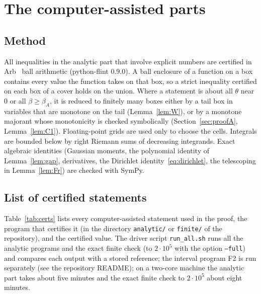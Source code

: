 \documentclass[11pt]{amsart}
\theoremstyle{definition}
\theoremstyle{remark}
\numberwithin{equation}{section}
\begin{document}
\section{The computer-assisted parts}\label{sec:computer}

\subsection{Method}
All inequalities in the analytic part that involve explicit numbers are certified in Arb~\cite{Arb} ball arithmetic (python-flint 0.9.0).
A ball enclosure of a function on a box contains every value the function takes on that box, so a strict inequality certified on each box of
a cover holds on the union. Where a statement is about all $\theta$ near $0$ or all $\beta\ge\beta_A$, it is reduced to finitely many boxes
either by a tail box in variables that are monotone on the tail (Lemma~\ref{lem:W}), or by a monotone majorant whose monotonicity is checked
symbolically (Section~\ref{sec:proofA}, Lemma~\ref{lem:C1}). Floating-point grids are used only to choose the cells. Integrals are bounded
below by right Riemann sums of decreasing integrands. Exact algebraic identities (Gaussian moments, the polynomial identity of
Lemma~\ref{lem:gap}, derivatives, the Dirichlet identity~\eqref{eq:dirichlet}, the telescoping in Lemma~\ref{lem:Fr}) are checked with
SymPy.

\subsection{List of certified statements}
Table~\ref{tab:certs} lists every computer-assisted statement used in the proof, the program that certifies it (in the directory
\texttt{analytic/} or \texttt{finite/} of the repository), and the certified value. The driver script \texttt{run\_all.sh} runs all
the analytic programs and the exact finite check (to $2\cdot10^5$ with the option \texttt{--full}) and compares each output with a
stored reference; the interval program F2 is run separately (see the repository README); on a two-core machine the analytic part takes about five minutes and the
exact finite check to $2\cdot10^5$ about eight minutes.
\end{document}
